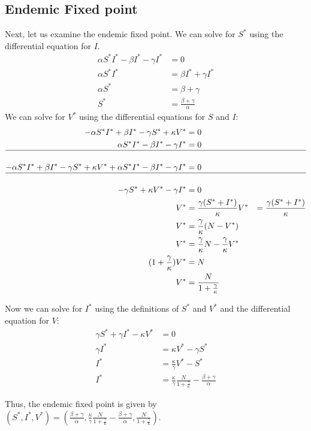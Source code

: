 \documentclass[12pt]{article}
\begin{document}
\subsection{Endemic Fixed point}
Next, let us examine the endemic fixed point. We can solve for $S^*$ using the differential equation for $I$.
$$
\begin{aligned}
\alpha S^*I^* - \beta I^* - \gamma I^* &= 0 \\
\alpha S^*I^* &= \beta I^* + \gamma I^* \\
\alpha S^* &= \beta + \gamma \\
S^* &= \frac{\beta + \gamma}{\alpha}
\end{aligned}
$$
We can solve for $V^*$ using the differential equations for $S$ and $I$:
$$
\begin{aligned} 
-\alpha S^*I^* + \beta I^* - \gamma S^* + \kappa V^* &= 0\\
\alpha S^*I^* - \beta I^* - \gamma I^* &= 0 \\
\hline \\
-\alpha S^*I^* + \beta I^* - \gamma S^* + \kappa V^* + \alpha S^*I^* - \beta I^* - \gamma I^* &= 0 \\
\hline \\
- \gamma S^* + \kappa V^* - \gamma I^* &= 0\\
V^* &= \frac{\gamma(S^* + I^*)}{\kappa}
V^* &= \frac{\gamma(S^* + I^*)}{\kappa} \\
V^* &= \frac{\gamma}{\kappa}(N - V^*) \\
V^* &= \frac{\gamma}{\kappa}N - \frac{\gamma}{\kappa}V^* \\
(1 + \frac{\gamma}{\kappa})V^* &= N \\
V^* &= \frac{N}{1 + \frac{\gamma}{\kappa}}
\end{aligned}
$$

Now we can solve for $I^*$ using the definitions of $S^*$ and $V^*$ and the differential equation for $V$:
$$
\begin{aligned}
\gamma S^* + \gamma I^* - \kappa V^* &= 0 \\
\gamma I^* &= \kappa V^* - \gamma S^* \\
I^* &= \frac{\kappa }{\gamma}V^* - S^* \\
I^* &= \frac{\kappa}{\gamma}\frac{N}{1 + \frac{\gamma}{\kappa}} - \frac{\beta + \gamma}{\alpha}
\end{aligned}
$$

Thus, the endemic fixed point is given by $(S^*, I^*, V^*) = (\frac{\beta + \gamma}{\alpha}, \frac{\kappa}{\gamma}\frac{N}{1 + \frac{\gamma}{\kappa}} - \frac{\beta + \gamma}{\alpha}, \frac{N}{1 + \frac{\gamma}{\kappa}})$. 
\end{document}
